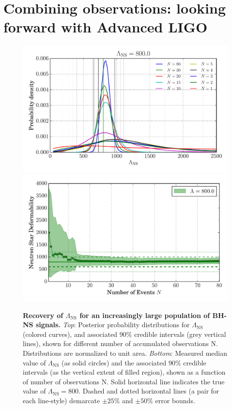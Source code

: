 \documentclass[aps,prd,amsmath,floats,floatfix, twocolumn,
superscriptaddress,nofootinbib,showpacs]{revtex4-1}
\newcommand{\lambdans}{\Lambda_\mathrm{NS}}
\begin{document}
\section{Combining observations: looking forward with Advanced LIGO}\label{s1:multiple_observations}
% 
\begin{figure}
\centering    
\includegraphics[trim=18 18 18 10 0,clip=true,width=\columnwidth]{pdfLambda_vs_N_L800.pdf}\\
\includegraphics[trim=18 18 18 10 0,clip=true,width=\columnwidth]{FillBetweenErrorBarsLambda_vs_N_L800.pdf}
\caption{{\bf Recovery of $\lambdans$ for an increasingly large population of BH-NS signals.}
{\it Top}: Posterior probability distributions for $\lambdans$ (colored curves), and
associated $90\%$ credible intervals (grey vertical lines), shown for different number
of accumulated observations N. Distributions are normalized to unit area.  
{\it Bottom}: Measured median value of $\lambdans$ (as solid circles) and the
associated $90\%$ credible intervals (as the vertical extent of filled region), shown as
a function of number of observations N. Solid horizontal line indicates the true value of
$\lambdans=800$. Dashed and dotted horizontal lines (a pair for each line-style) demarcate
$\pm 25\%$ and $\pm 50\%$ error bounds.
}
\label{fig:TT_Lambda_vs_N_L800_CI90_0}
\end{figure}
\end{document}
